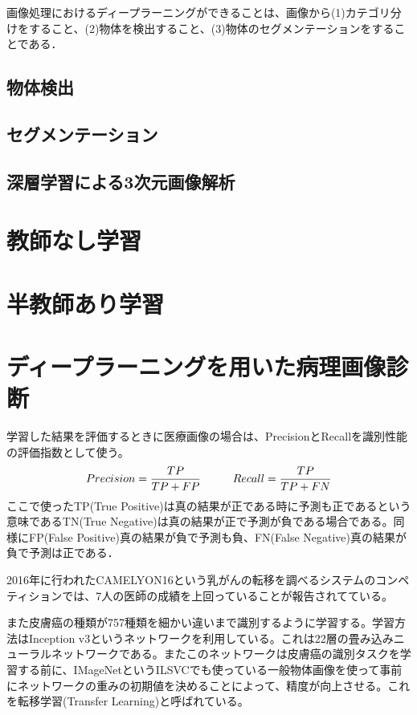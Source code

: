 画像処理におけるディープラーニングができることは、画像から(1)カテゴリ分けをすること、(2)物体を検出すること、(3)物体のセグメンテーションをすることである．

\subsection*{物体検出}

\subsection*{セグメンテーション}

\subsection*{深層学習による3次元画像解析}

\section{教師なし学習}

\section{半教師あり学習}

\section{ディープラーニングを用いた病理画像診断}
学習した結果を評価するときに医療画像の場合は、PrecisionとRecallを識別性能の評価指数として使う。\[ Precision = \frac{TP}{TP+FP}\hspace{10mm} Recall = \frac{TP}{TP+FN} \]ここで使ったTP(True Positive)は真の結果が正である時に予測も正であるという意味であるTN(True Negative)は真の結果が正で予測が負である場合である。同様にFP(False Positive)真の結果が負で予測も負、FN(False Negative)真の結果が負で予測は正である．

2016年に行われたCAMELYON16という乳がんの転移を調べるシステムのコンペティションでは、7人の医師の成績を上回っていることが報告されてている。

また皮膚癌の種類が757種類を細かい違いまで識別するように学習する。学習方法はInception v3というネットワークを利用している。これは22層の畳み込みニューラルネットワークである。またこのネットワークは皮膚癌の識別タスクを学習する前に、IMageNetというILSVCでも使っている一般物体画像を使って事前にネットワークの重みの初期値を決めることによって、精度が向上させる。これを転移学習(Transfer Learning)と呼ばれている。